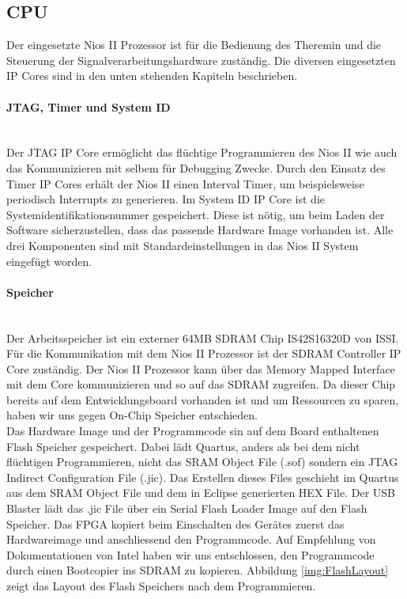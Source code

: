 \subsection{CPU}\label{subsec:CPU}
Der eingesetzte Nios II Prozessor ist für die Bedienung des Theremin und die Steuerung der Signalverarbeitungshardware zuständig. Die diversen eingesetzten IP Cores sind in den unten stehenden Kapiteln beschrieben.

\paragraph{JTAG, Timer und System ID}\mbox{}\\

Der JTAG IP Core ermöglicht das flüchtige Programmieren des Nios II wie auch das Kommunizieren mit selbem für Debugging Zwecke. 
Durch den Einsatz des Timer IP Cores erhält der Nios II einen Interval Timer, um beispielsweise periodisch Interrupts zu generieren. 
Im System ID IP Core ist die Systemidentifikationsnummer gespeichert. Diese ist nötig, um beim Laden der Software sicherzustellen, dass das passende Hardware Image vorhanden ist.
Alle drei Komponenten sind mit Standardeinstellungen in das Nios II System eingefügt worden.

\paragraph{Speicher}\mbox{}\\

Der Arbeitsspeicher ist ein externer 64MB SDRAM Chip IS42S16320D von ISSI. Für die Kommunikation mit dem Nios II Prozessor ist der SDRAM Controller IP Core zuständig. Der Nios II Prozessor kann über das Memory Mapped Interface mit dem Core kommunizieren und so auf das SDRAM zugreifen. Da dieser Chip bereits auf dem Entwicklungsboard vorhanden ist und um Ressourcen zu sparen, haben wir uns gegen On-Chip Speicher entschieden.\\

Das Hardware Image und der Programmcode sin auf dem Board enthaltenen Flash Speicher gespeichert. Dabei lädt Quartus, anders als bei dem nicht flüchtigen Programmieren, nicht das SRAM Object File (.sof) sondern ein JTAG Indirect Configuration File (.jic). Das Erstellen dieses Files geschieht im Quartus aus dem SRAM Object File und dem in Eclipse generierten HEX File. Der USB Blaster lädt das .jic File über ein Serial Flash Loader Image auf den Flash Speicher. Das FPGA kopiert beim Einschalten des Gerätes zuerst das Hardwareimage und anschliessend den Programmcode. Auf Empfehlung von Dokumentationen von Intel haben wir uns entschlossen, den Programmcode durch einen Bootcopier ins SDRAM zu kopieren. Abbildung \ref{img:FlashLayout} zeigt das Layout des Flash Speichers nach dem Programmieren. \cite{non_volatile}

